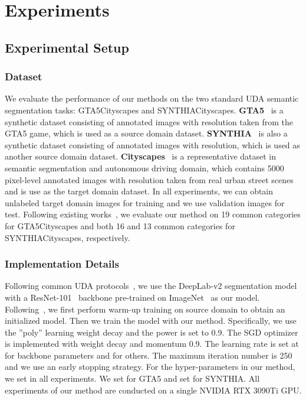 \documentclass[sigconf]{acmart}
\begin{document}
	\section{Experiments}
	\subsection{Experimental Setup}
	\subsubsection{Dataset}
	
	We evaluate the performance of our methods on the two standard UDA semantic segmentation tasks: GTA5Cityscapes and SYNTHIACityscapes. 
	\textbf{GTA5}~\cite{richter2016playing} is a synthetic dataset consisting of  annotated images with  resolution taken from the GTA5 game, which is used as a source domain dataset. 
	\textbf{SYNTHIA}~\cite{ros2016synthia} is also a synthetic dataset consisting of  annotated images with  resolution, which is used as another source domain dataset.
	\textbf{Cityscapes}~\cite{cordts2016cityscapes} is a representative dataset in semantic segmentation and autonomous driving domain, which contains 5000 pixel-level annotated images with  resolution taken from real urban street scenes and is use as the target domain dataset. In all experiments, we can obtain  unlabeled target domain images for training and we use  validation images for test.
	Following existing works~\cite{tranheden2021dacs,melas2021pixmatch}, we evaluate our method on 19 common categories for GTA5Cityscapes and both 16 and 13 common categories for SYNTHIACityscapes, respectively. 
	
	
	\subsubsection{Implementation Details}
	
	Following common UDA protocols~\cite{tranheden2021dacs,melas2021pixmatch,zhou2021domain}, we use the DeepLab-v2 segmentation model~\cite{chen2017deeplab} with a ResNet-101~\cite{he2016deep} backbone pre-trained on ImageNet~\cite{deng2009imagenet} as our model. Following~\cite{chen2019domain}, we first perform warm-up training on source domain to obtain an initialized model. Then we train the model with our method. 
	Specifically, we use the ''poly'' learning weight decay and the power is set to 0.9. The SGD optimizer is implemented with weight decay  and momentum 0.9. The learning rate is set at  for backbone parameters and  for others. The maximum iteration number is 250 and we use an early stopping strategy. For the hyper-parameters in our method, we set  in all experiments. We set  for GTA5 and set  for SYNTHIA.
	All experiments of our method are conducted on a single NVIDIA RTX 3090Ti GPU. 
	
\end{document}
